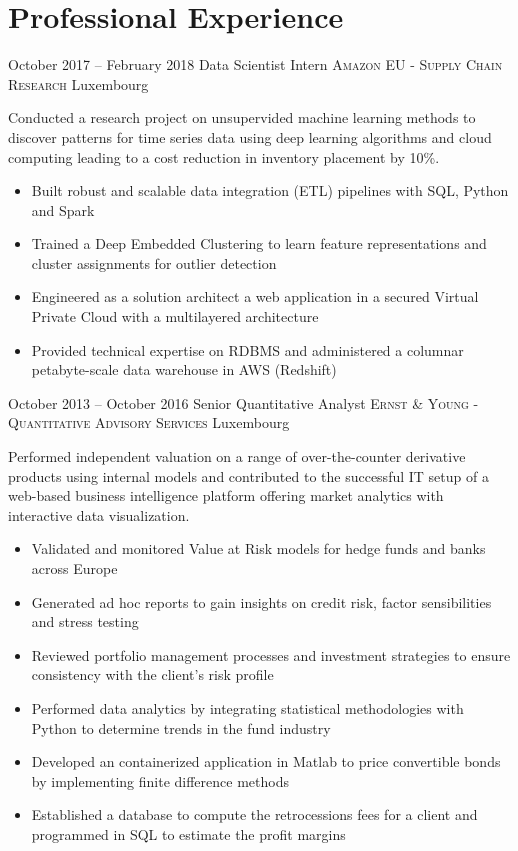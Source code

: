 \documentclass[11pt,a4paper,sans]{moderncv}
\begin{document}
\section{\LARGE{Professional Experience}}
\vspace{2mm}
\cventry
	{October 2017 -- February 2018}
	{Data Scientist Intern}
	{\textsc{Amazon EU - Supply Chain Research}}
	{Luxembourg}{}
	{
	Conducted a research project on unsupervided machine learning methods to discover patterns for time series data using deep learning algorithms and cloud computing leading to a cost reduction in inventory placement by 10\%. 
	\vspace{1mm}
	\begin{itemize}
		\item Built robust and scalable data integration (ETL) pipelines with SQL, Python and Spark
		\item Trained a Deep Embedded Clustering to learn feature representations and cluster assignments for outlier detection 
		\item Engineered as a solution architect a web application in a secured Virtual Private Cloud with a multilayered architecture
		\item Provided technical expertise on RDBMS and administered a columnar petabyte-scale data warehouse in AWS (Redshift)
		\vspace{2mm}
	\end{itemize}
	} 
\cventry
	{October 2013 -- October 2016}
	{Senior Quantitative Analyst}
	{\textsc{Ernst \& Young - Quantitative Advisory Services}}
	{Luxembourg}{}
	{
	Performed independent valuation on a range of over-the-counter derivative products using internal models and contributed to the successful IT setup of a web-based business intelligence platform offering market analytics with interactive data visualization.
	\vspace{1mm}
	\begin{itemize}
		\item Validated and monitored Value at Risk models for hedge funds and banks across Europe
		\item Generated ad hoc reports to gain insights on credit risk, factor sensibilities and stress testing
		\item Reviewed portfolio management processes and investment strategies to ensure consistency with the client's risk profile
		\item Performed data analytics by integrating statistical methodologies with Python to determine trends in the fund industry
		\item Developed an containerized application in Matlab to price convertible bonds by implementing finite difference methods
		\item Established a database to compute the retrocessions fees for a client and programmed in SQL to estimate the profit margins
		\vspace{2mm}
	\end{itemize}
	} 
\end{document}
